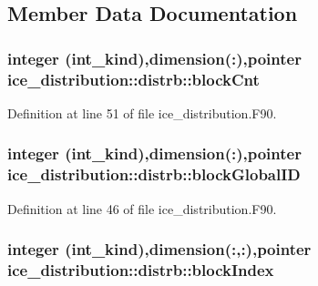 \subsection{Member Data Documentation}
\hypertarget{typeice__distribution_1_1distrb_a716214843ba2cf03a241962abe8f0b6e}{
\subsubsection[{blockCnt}]{\setlength{\rightskip}{0pt plus 5cm}integer (int\_\-kind),dimension(:),pointer {\bf ice\_\-distribution::distrb::blockCnt}}}
\label{typeice__distribution_1_1distrb_a716214843ba2cf03a241962abe8f0b6e}


Definition at line 51 of file ice\_\-distribution.F90.\hypertarget{typeice__distribution_1_1distrb_af2b95b1f97c77038575133106fa9922a}{
\subsubsection[{blockGlobalID}]{\setlength{\rightskip}{0pt plus 5cm}integer (int\_\-kind),dimension(:),pointer {\bf ice\_\-distribution::distrb::blockGlobalID}}}
\label{typeice__distribution_1_1distrb_af2b95b1f97c77038575133106fa9922a}


Definition at line 46 of file ice\_\-distribution.F90.\hypertarget{typeice__distribution_1_1distrb_a94868e55b2859dbebbe89bd75146395f}{
\subsubsection[{blockIndex}]{\setlength{\rightskip}{0pt plus 5cm}integer (int\_\-kind),dimension(:,:),pointer {\bf ice\_\-distribution::distrb::blockIndex}}}
\label{typeice__distribution_1_1distrb_a94868e55b2859dbebbe89bd75146395f}


